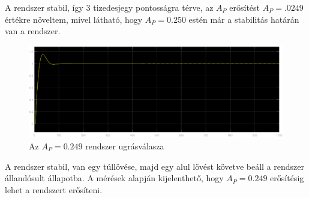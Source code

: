\documentclass[12pt]{article}
\begin{document}
A rendszer stabil, így 3 tizedesjegy pontosságra térve, az $A_P$ erősítést $A_P=.0249$ értékre növeltem, mivel látható, hogy $A_P=0.250$ estén már a stabilitás határán van a rendszer.
\begin{figure}[H]
\centering
\includegraphics[scale=.50]{ap0249}
\caption{Az $A_P=0.249$ rendszer ugrásválasza}
\end{figure}
A rendszer stabil, van egy túllövése, majd egy alul lövést követve beáll a rendszer állandósult állapotba. A mérések alapján kijelenthető, hogy $A_P=0.249$ erősítésig lehet a rendszert erősíteni.
\end{document}
